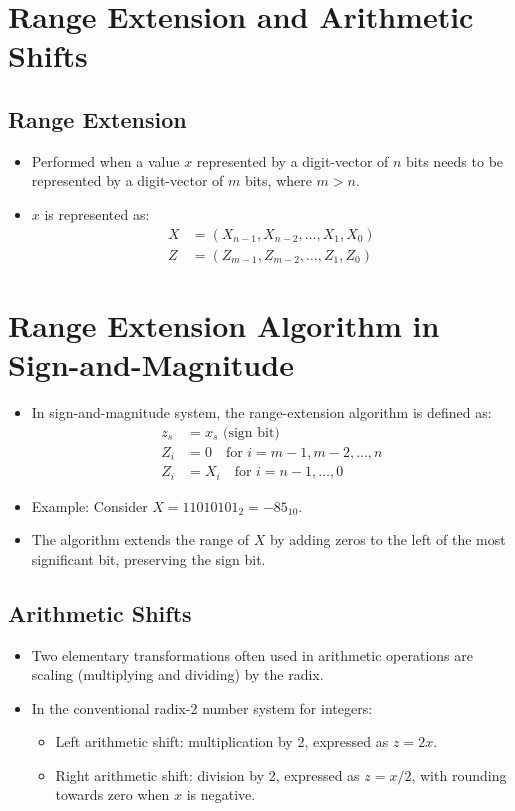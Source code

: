 \documentclass[12pt,openany]{book}
\begin{document}
	\section{Range Extension and Arithmetic Shifts}
	\subsection{Range Extension}
	
	\begin{itemize}
		\item[] Performed when a value \( x \) represented by a digit-vector of \( n \) bits needs to be represented by a digit-vector of \( m \) bits, where \( m > n \).
		\item[] \( x \) is represented as:
			  \begin{align*}
				  X & = (X_{n-1}, X_{n-2}, \ldots, X_1, X_0) \\
				  Z & = (Z_{m-1}, Z_{m-2}, \ldots, Z_1, Z_0) 
			  \end{align*}
	\end{itemize}
	
	\small \section{Range Extension Algorithm in Sign-and-Magnitude}
	\begin{itemize}
		\item[] In sign-and-magnitude system, the range-extension algorithm is defined as:
			  \begin{align*}
				  z_s & = x_s \text{ (sign bit)}                          \\
				  Z_i & = 0 \quad \text{for } i = m - 1, m - 2, \ldots, n \\
				  Z_i & = X_i \quad \text{for } i = n - 1, \ldots, 0      
			  \end{align*}
		\item[] Example: Consider \( X = 11010101_2 = -85_{10} \).
		\item[] The algorithm extends the range of \( X \) by adding zeros to the left of the most significant bit, preserving the sign bit.
	\end{itemize}
	
	
	\subsection{Arithmetic Shifts}
	
	\begin{itemize}
		\item[] Two elementary transformations often used in arithmetic operations are scaling (multiplying and dividing) by the radix.
		\item[] In the conventional radix-2 number system for integers:
			  \begin{itemize}
				  \item[] Left arithmetic shift: multiplication by 2, expressed as \( z = 2x \).
				  \item[] Right arithmetic shift: division by 2, expressed as \( z = x/2 \), with rounding towards zero when \( x \) is negative.
			  \end{itemize}
	\end{itemize}
	
\end{document}
